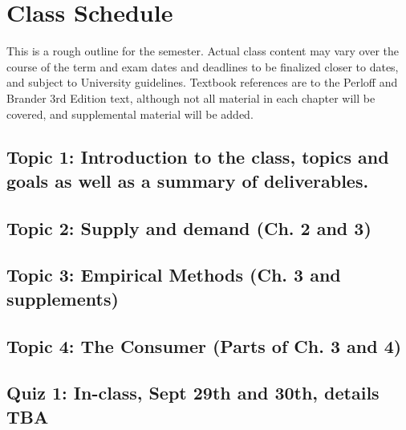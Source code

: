 \documentclass[11pt,]{article}
\begin{document}
\hypertarget{class-schedule}{%
\section{Class Schedule}\label{class-schedule}}

This is a rough outline for the semester. Actual class content may vary
over the course of the term and exam dates and deadlines to be finalized
closer to dates, and subject to University guidelines. Textbook
references are to the Perloff and Brander 3rd Edition text, although not
all material in each chapter will be covered, and supplemental material
will be added.

\hypertarget{topic-1-introduction-to-the-class-topics-and-goals-as-well-as-a-summary-of-deliverables.}{%
\subsection{Topic 1: Introduction to the class, topics and goals as well
as a summary of
deliverables.}\label{topic-1-introduction-to-the-class-topics-and-goals-as-well-as-a-summary-of-deliverables.}}

\hypertarget{topic-2-supply-and-demand-ch.-2-and-3}{%
\subsection{Topic 2: Supply and demand (Ch. 2 and
3)}\label{topic-2-supply-and-demand-ch.-2-and-3}}


\hypertarget{topic-3-empirics-ch-3}{%
\subsection{Topic 3: Empirical Methods  (Ch. 3 and supplements)}\label{topic-3-empirics-ch3}}


\hypertarget{topic-4-the-consumer-parts-of-ch.-3-and-4}{%
\subsection{Topic 4: The Consumer (Parts of Ch. 3 and
4)}\label{topic-4-the-consumer-parts-of-ch.-3-and-4}}


\hypertarget{quiz-1-week-of-sept-27th-details-tba}{%
\subsection{Quiz 1: In-class, Sept 29th and 30th, details
TBA}\label{quiz-1-week-of-sept-27th-details-tba}}
\end{document}
